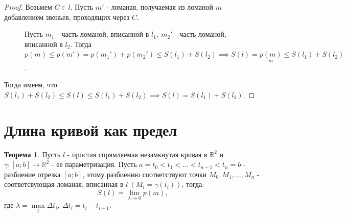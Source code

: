 \documentclass{report}
\theoremstyle{definition}
\newtheorem{theorem}{Теорема}[section]
\begin{document}
\begin{proof}
  Возьмем $C \in l$. Пусть $m'$ - ломаная, получаемая из ломаной $m$ добавлением звеньев,
  проходящих через $C$.
  \begin{figure}[h]
    \begin{minipage}[h]{0.49\linewidth}
    \end{minipage}
    \hfill
    \begin{minipage}[h]{0.49\linewidth}
      Пусть $m_1$ - часть ломаной, вписанной в $l_1, \ m_2'$ - часть ломаной, вписанной
      в $l_2$. Тогда $p(m) \leqslant p(m') = p(m_1') + p(m_2') \leqslant S(l_1) + S(l_2) \implies
        S(l) = \underset{m}{p(m)} \leqslant S(l_1) + S(l_2)$.
    \end{minipage}
  \end{figure}



  Тогда имеем, что $S(l_1) + S(l_2) \leqslant S(l) \leqslant S(l_1) + S(l_2) \implies S(l) =
    S(l_1) + S(l_2)$.
\end{proof}

\section{Длина кривой как предел}

\begin{theorem}
  Пусть $l$ - простая спрямляемая незамкнутая кривая в $\mathbb{R}^2$ и $\gamma:[a;b]\rightarrow\mathbb{R}^2$
  - ее параметризация. Пусть $a = t_0 < t_1 < \ldots < t_{n-1} < t_n = b$ - разбиение отрезка $[a;b]$,
  этому разбиению соответствуют точки $M_0,M_1,\ldots,M_n$ - соответсвующая ломаная, вписанная в $l \
    (M_i = \gamma(t_i))$, тогда:
  \begin{equation*}
    S(l) = \underset{\lambda\rightarrow0}{\lim}p(m),
  \end{equation*}
  где $\lambda = \underset{i}{\max}\Delta t_i, \ \Delta t_i = t_i - t_{i-1}$.
\end{theorem}
\end{document}
